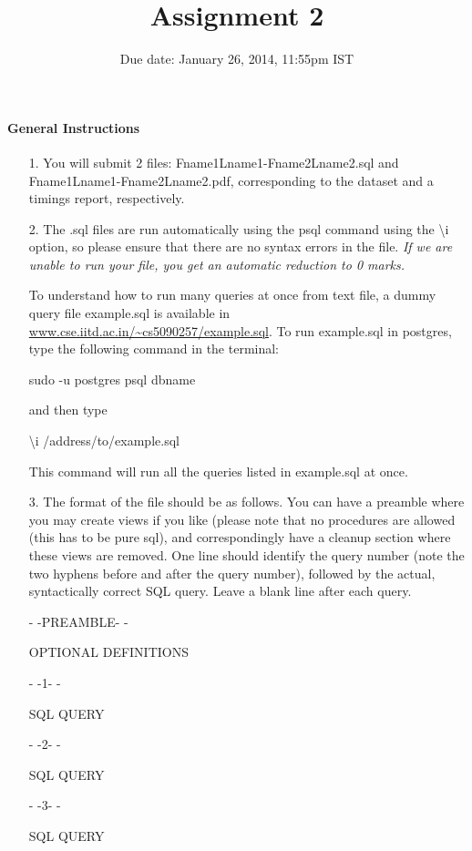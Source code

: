 \documentclass[10pt]{article}
\title{Assignment 2}
\date{Due date: January 26, 2014, 11:55pm IST}
\begin{document}
\maketitle
\paragraph*{General Instructions}


\begin{itemize}

\item[1.]You will submit 2 files: Fname1Lname1-Fname2Lname2.sql and Fname1Lname1-Fname2Lname2.pdf, corresponding to the dataset and a timings report, respectively.

\item[2.]The .sql files are run automatically using the psql command using the \textbackslash i option, so please ensure that there are no syntax errors in the file. {\it If we are unable to run your file, you get an automatic reduction to 0 marks.}


To understand how to run many queries at once from text file, a dummy query file example.sql is available in 
\url{www.cse.iitd.ac.in/~cs5090257/example.sql}. To run example.sql in postgres, type the following command in the terminal:

sudo -u postgres psql dbname

and then type 

\textbackslash i /address/to/example.sql

This command will run all the queries listed in example.sql at once.  

\item[3.] The format of the file should be as follows. You can have a preamble where you may create views if you like (please note that no procedures are allowed (this has to be pure sql), and correspondingly have a cleanup section where these views are removed. One line should identify the query number (note the two hyphens before and after the query number), followed by the actual, syntactically correct SQL
query. Leave a blank line after each query. 

- -PREAMBLE- -

OPTIONAL DEFINITIONS

- -1- -

SQL QUERY

- -2- -

SQL QUERY

- -3- -

SQL QUERY


\end{itemize}
\end{document}
